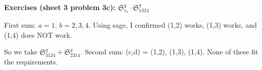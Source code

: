 \textbf{Exercises (sheet 3 problem 3c): $\mathfrak{S}_{s_1}^q \cdot \mathfrak{S}_{1324}^q$}

First sum: $a = 1$, $b = 2, 3, 4$. Using sage, I confirmed (1,2) works, (1,3) works, and (1,4) does NOT work.

So we take $\mathfrak{S}_{3124}^q + \mathfrak{S}_{2314}^q$. 
Second sum: (c,d) = (1,2), (1,3), (1,4). None of these fit the requirements.

